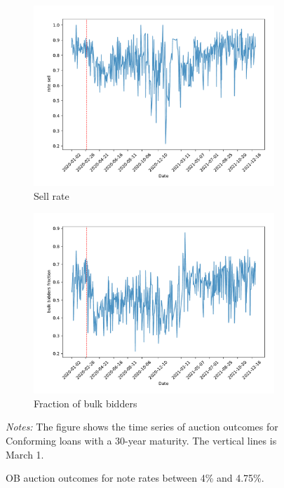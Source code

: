 \documentclass[11pt,a4paper]{article}
\begin{document}
\begin{figure}[h]
\begin{subfigure}[b]{0.49\textwidth}
      \includegraphics[width=0.998\textwidth]{../results/figures/dummy_sell_any_mean_mat30_loan1_timeseries_nr_4_4.75.pdf}
      \caption{ Sell rate}
     \end{subfigure}
     \begin{subfigure}[b]{0.49\textwidth}
      \includegraphics[width=0.998\textwidth]{../results/figures/bulk_bidders_fraction_mean_mat30_loan1_timeseries_nr_4_4.75.pdf}
      \caption{ Fraction of bulk bidders}
     \end{subfigure}
     \caption{OB auction outcomes for note rates between 4\% and 4.75\%. } 
   \begin{minipage}{\textwidth}
      \footnotesize{\textit{Notes:} The figure shows the time series of auction outcomes for Conforming loans with a 30-year maturity. The vertical lines is March 1.  } 
      \end{minipage}
\end{figure}
\end{document}
